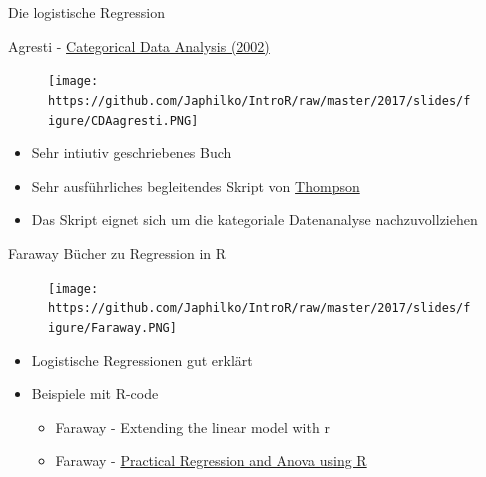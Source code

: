 \documentclass[ignorenonframetext,]{beamer}
\providecommand{\tightlist}{%
\setlength{\itemsep}{0pt}\setlength{\parskip}{0pt}}
\begin{document}
\begin{frame}{Die logistische Regression}

\end{frame}

\begin{frame}{Agresti -
\href{https://mathdept.iut.ac.ir/sites/mathdept.iut.ac.ir/files/AGRESTI.PDF}{Categorical
Data Analysis (2002)}}

\begin{figure}[htbp]
\centering
\texttt{[image: https://github.com/Japhilko/IntroR/raw/master/2017/slides/figure/CDAagresti.PNG]}
\caption{}
\end{figure}

\begin{itemize}
\tightlist
\item
  Sehr intiutiv geschriebenes Buch
\item
  Sehr ausführliches begleitendes Skript von
  \href{http://statweb.stanford.edu/~owen/courses/306a/Splusdiscrete2.pdf}{Thompson}
\item
  Das Skript eignet sich um die kategoriale Datenanalyse
  nachzuvollziehen
\end{itemize}

\end{frame}

\begin{frame}{Faraway Bücher zu Regression in R}

\begin{figure}[htbp]
\centering
\texttt{[image: https://github.com/Japhilko/IntroR/raw/master/2017/slides/figure/Faraway.PNG]}
\caption{}
\end{figure}

\begin{itemize}
\item
  Logistische Regressionen gut erklärt
\item
  Beispiele mit R-code

  \begin{itemize}
  \item
    Faraway - Extending the linear model with r
  \item
    Faraway -
    \href{https://cran.r-project.org/doc/contrib/Faraway-PRA.pdf}{Practical
    Regression and Anova using R}
  \end{itemize}
\end{itemize}

\end{frame}
\end{document}
